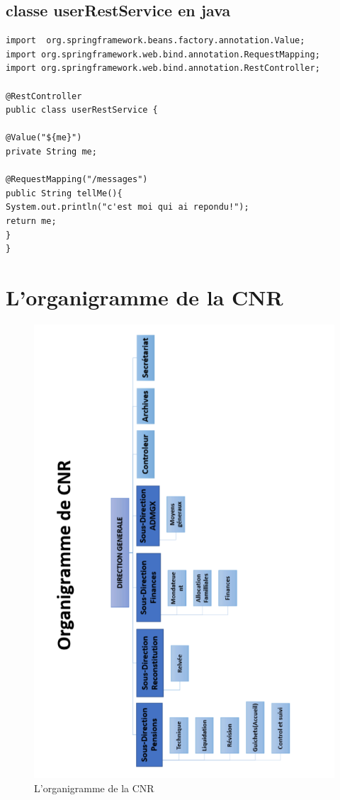        \section{classe userRestService en java }
      \begin{lstlisting}
import  org.springframework.beans.factory.annotation.Value;
import org.springframework.web.bind.annotation.RequestMapping;
import org.springframework.web.bind.annotation.RestController;

@RestController
public class userRestService {

@Value("${me}")
private String me;

@RequestMapping("/messages")
public String tellMe(){
System.out.println("c'est moi qui ai repondu!");
return me;
}
}
      \end{lstlisting}  
        
        \chapter{L'organigramme de la CNR}
       
        
 
        
      
\begin{figure}[H]
	\centering
	\includegraphics[width=1\linewidth,height=0.58\paperheight]{images/orgpdf}
	\caption{L'organigramme de la CNR}
	\label{fig:orgpdf}
\end{figure}
